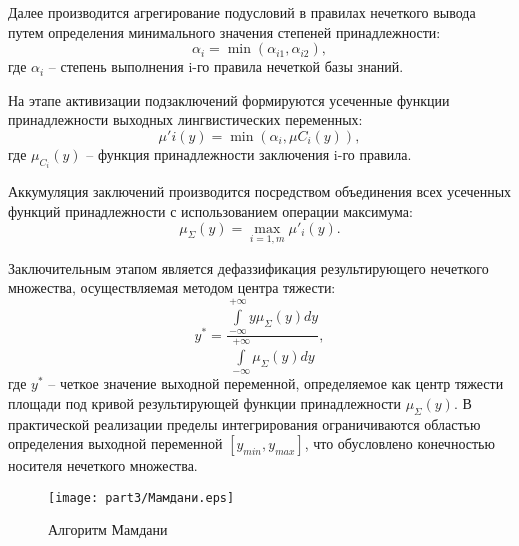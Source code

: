 Далее производится агрегирование подусловий в правилах нечеткого вывода путем
определения минимального значения степеней принадлежности:
\begin{equation*}
	\alpha_i = \min(\alpha_{i1}, \alpha_{i2}),
\end{equation*}
где $\alpha_i$ -- степень выполнения i-го правила нечеткой базы знаний.

На этапе активизации подзаключений формируются усеченные
функции принадлежности выходных лингвистических переменных:
\begin{equation*}
	\mu'i(y) = \min(\alpha_i, \mu{C_i}(y)),
\end{equation*}
где $\mu_{C_i}(y)$ -- функция принадлежности заключения i-го правила.

Аккумуляция заключений производится посредством объединения всех
усеченных функций принадлежности с использованием операции максимума:
\begin{equation*}
	\mu_\Sigma(y) = \max_{i=1,m}\mu'_i(y).
\end{equation*}

Заключительным этапом является дефаззификация результирующего
нечеткого множества, осуществляемая методом центра тяжести:
\begin{equation*}
	y^* = \frac{\displaystyle\int\limits_{-\infty}^{+\infty} y\mu_\Sigma(y)dy}{\displaystyle\int\limits_{-\infty}^{+\infty} \mu_\Sigma(y)dy},
\end{equation*}
где $y^*$ -- четкое значение выходной переменной, определяемое как центр тяжести площади под кривой
результирующей функции принадлежности $\mu_\Sigma(y)$.
В практической реализации пределы интегрирования ограничиваются областью определения
выходной переменной $[y_{min}, y_{max}]$, что обусловлено конечностью носителя нечеткого множества.

\begin{figure}[ht]
	\centering
	\texttt{[image: part3/Мамдани.eps]}
	\caption{Алгоритм Мамдани}
	\label{fig:fuzzy_inference}
\end{figure}

